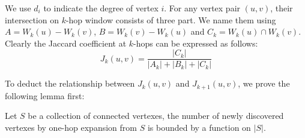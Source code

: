 We use $d_i$ to indicate the degree of vertex $i$. For any vertex pair $(u,v)$, their 
intersection on $k$-hop window consists of three part. We name them using $A=W_k(u)-W_k(v)$, 
$B=W_k(v)-W_k(u)$ and $C_k = W_k(u) \cap W_k(v)$. Clearly the Jaccard coefficient at $k$-hops
can be expressed as follows:
\begin{equation}
	J_k(u,v) = \frac{|C_k|}{|A_k| + |B_k| + |C_k|}
\end{equation}

To deduct the relationship between $J_k(u,v)$ and $J_{k+1}(u,v)$, we prove the following lemma first:
\begin{theorem}
Let $S$ be a collection of connected vertexes, the number of newly discovered
vertexes by one-hop expansion from $S$ is bounded by a function on $|S|$.
\end{theorem}
